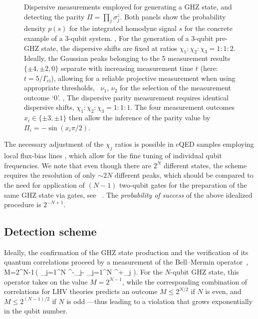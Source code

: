 \begin{figure}
\centering
{}
\caption[Dispersive measurements for generating and detecting GHZ state]
{
     Dispersive measurements employed for  generating a GHZ state, and  detecting the parity $\Pi=\prod_j\sigma^z_j$. Both panels show the probability density $p(s)$ for the integrated homodyne signal $s$ for the concrete example of a 3-qubit system. , For the generation of a 3-qubit pre-GHZ state, the dispersive shifts are fixed at ratios $\chi_1:\chi_2:\chi_3=1:1:2$. Ideally, the Gaussian peaks belonging to the 5 measurement results $\{\pm4,\pm2,0\}$ separate with increasing measurement time $t$ (here: $t=5/\Gamma_\text{ci}$), allowing for a reliable projective measurement when using appropriate thresholds, \eg\ $\nu_1$, $\nu_2$ for the selection of the measurement outcome `$0$'. , The dispersive parity measurement requires identical dispersive shifts, $\chi_1:\chi_2:\chi_3=1:1:1$. The four measurement  outcomes $x_i\in\{\pm3,\pm1\}$ then allow the inference of the parity value by $\Pi_i=-\sin(x_i\pi/2)$.\label{fig:figure1}}
\end{figure}%
The necessary adjustment of the $\chi_j$ ratios is possible in cQED samples employing local flux-bias lines \cite{dicarlo_demonstration_2009}, which allow for the fine tuning of individual qubit frequencies. We note that even though there are $2^N$ different states, the scheme requires the resolution of only $\sim2N$ different peaks, which should be compared to the need for application of $(N - 1)$ two-qubit gates for the preparation of the same GHZ state via gates, see \eg\ \cite{bodoky_production_2007}. The \emph{probability of success} of the above idealized procedure is $2^{-N+1}$.


\subsection{Detection scheme\label{sec:perfdetect}}
Ideally, the confirmation of the GHZ state production and the verification of its quantum correlations proceed by a measurement of the Bell--Mermin operator~\cite{mermin_extreme_1990},
\be\label{merminop}
M=2^{N-1}\,\rmi\bigg( \prod_{j=1}^N \sigma^-_j- \prod_{j=1}^N \sigma^+_j \bigg).
\ee
For the $N$-qubit GHZ state, this operator takes on the value $M=2^{N-1}$, while the corresponding combination of correlations for LHV theories predicts an outcome $M\le 2^{N/2}$ if $N$ is even, and $M\le 2^{(N-1)/2}$ if $N$ is odd \cite{mermin_extreme_1990}---thus leading to a violation that grows exponentially in the qubit number.

